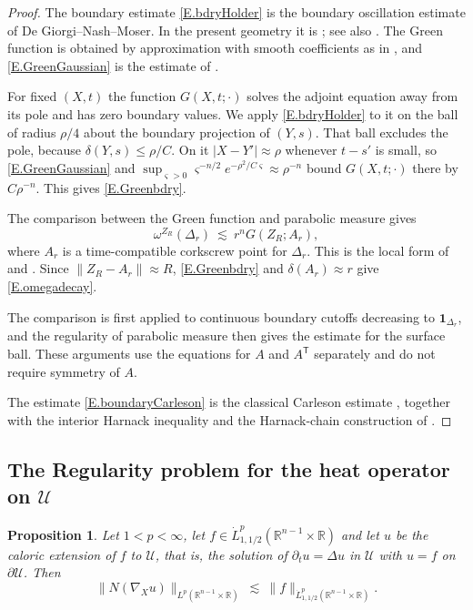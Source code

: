\documentclass[12pt,leqno]{amsart}
\numberwithin{equation}{section}
\newcommand{\R}{\mathbb R}
\newcommand{\pd}{\partial}
\newcommand{\Uc}{\mathcal U}
\theoremstyle{plain}
\newtheorem{proposition}[equation]{Proposition}
\theoremstyle{remark}
\begin{document}
\begin{proof}
The boundary estimate \eqref{E.bdryHolder} is the boundary oscillation estimate
of De Giorgi--Nash--Moser. In the present geometry it is
\cite[Chapter I, Lemma 3.9]{HLmem}; see also \cite[\S2]{N}. The Green function
is obtained by approximation with smooth coefficients as in
\cite[Chapter I, \S3]{HLmem}, and \eqref{E.GreenGaussian} is the estimate of
\cite{Ar}.

For fixed $(X,t)$ the function $G(X,t;\cdot)$ solves the adjoint equation away
from its pole and has zero boundary values.  We apply \eqref{E.bdryHolder} to
it on the ball of radius $\rho/4$ about the boundary projection of $(Y,s)$.
That ball excludes the pole, because $\delta(Y,s)\le\rho/C$.  On it
$|X-Y'|\approx\rho$ whenever $t-s'$ is small, so \eqref{E.GreenGaussian} and
$\sup_{\varsigma>0}\varsigma^{-n/2}e^{-\rho^2/C\varsigma}\approx\rho^{-n}$
bound $G(X,t;\cdot)$ there by $C\rho^{-n}$.  This gives \eqref{E.Greenbdry}.

The comparison between the Green function and parabolic measure gives
\[
 \omega^{Z_R}(\Delta_r)\ \lesssim\ r^nG(Z_R;A_r),
\]
where $A_r$ is a time-compatible corkscrew point for $\Delta_r$.  This is the
local form of \cite[Chapter I, Lemma 3.10]{HLmem} and
\cite[\S\S3--4]{N}.  Since $\|Z_R-A_r\|\approx R$,
\eqref{E.Greenbdry} and $\delta(A_r)\approx r$ give
\eqref{E.omegadecay}.

The comparison is first applied to continuous boundary cutoffs decreasing to
$\mathbf1_{\Delta_r}$, and the regularity of parabolic measure then gives the
estimate for the surface ball.  These arguments use the equations for $A$ and
$A^{\mathsf T}$ separately and do not require symmetry of $A$.

The estimate \eqref{E.boundaryCarleson} is the classical Carleson estimate
\cite[Lemma 2.5]{N}, together with the interior Harnack inequality and the
Harnack-chain construction of \cite[\S2]{N}.
\end{proof}

\subsection{The Regularity problem for the heat operator on $\Uc$}
\label{ss.flat}

\begin{proposition}\label{P.flat}
Let $1<p<\infty$, let $f\in\dot L^p_{1,1/2}(\R^{n-1}\times\R)$ and let $u$ be
the caloric extension of $f$ to $\Uc$, that is, the solution of $\pd_tu=\Delta u$
in $\Uc$ with $u=f$ on $\pd\Uc$. Then
\begin{equation}\label{E.flat}
  \big\|N(\nabla_Xu)\big\|_{L^p(\R^{n-1}\times\R)}\ \lesssim\
  \|f\|_{\dot L^p_{1,1/2}(\R^{n-1}\times\R)} .
\end{equation}
\end{proposition}
\end{document}
